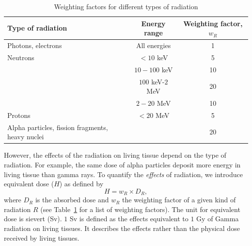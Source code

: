 \documentclass[nofootinbib,preprint,aps]{revtex4-1}
\begin{document}
        \begin{table}
            \centering
            \caption{Weighting factors for different types of radiation \cite{icrp74}}
            \begin{ruledtabular}
                \begin{tabular}{l c c}
                Type of radiation & Energy range & Weighting factor, $w_R$\\
                \hline
                Photons, electrons & All energies & 1\\
                Neutrons & $<10$ keV & 5 \\
                         & $10-100$ keV & 10 \\
                         & $100$ keV-$2$ MeV & 20 \\
                         & $2-20$ MeV & 10 \\
                Protons & $<20$ MeV & 5 \\
                Alpha particles, fission fragments, heavy nuclei & & $20$\\
            \end{tabular}
            \label{tab:eq}
            \end{ruledtabular}
        \end{table}
        However, the effects of the radiation on living tissue depend on the type of radiation.
        For example, the same dose of alpha particles deposit more energy in living tissue than gamma rays.
        To quantify the {\it effects} of radiation, we introduce equivalent
        dose ($H$) as defined by 
        \begin{equation}
        H=w_R \times D_R,
        \end{equation}
        where $D_R$ is the absorbed dose and $w_R$ the weighting factor of a given kind of radiation $R$
        (see Table~\ref{tab:eq} for a list of weighting factors). The unit for equivalent dose is sievert (Sv).
        $1$ Sv is defined as the effects equivalent to $1$ Gy of Gamma radiation on living tissues. It describes
        the effects rather than the physical dose received by living tissues.
\end{document}
